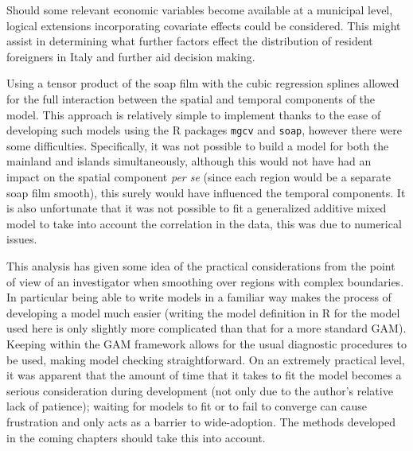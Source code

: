 Should some relevant economic variables become available at a municipal level, logical extensions incorporating covariate effects could be considered. This might assist in determining what further factors effect the distribution of resident foreigners in Italy and further aid decision making.

Using a tensor product of the soap film with the cubic regression splines allowed for the full interaction between the spatial and temporal components of the model. This approach is relatively simple to implement thanks to the ease of developing such models using the \textsf{R} packages \texttt{mgcv} and \texttt{soap}, however there were some difficulties. Specifically, it was not possible to build a model for both the mainland and islands simultaneously, although this would not have had an impact on the spatial component \textit{per se} (since each region would be a separate soap film smooth), this surely would have influenced the temporal components. It is also unfortunate that it was not possible to fit a generalized additive mixed model to take into account the correlation in the data, this was due to numerical issues.

This analysis has given some idea of the practical considerations from the point of view of an investigator when smoothing over regions with complex boundaries. In particular being able to write models in a familiar way makes the process of developing a model much easier (writing the model definition in \textsf{R} for the model used here is only slightly more complicated than that for a more standard GAM). Keeping within the GAM framework allows for the usual diagnostic procedures to be used, making model checking straightforward. On an extremely practical level, it was apparent that the amount of time that it takes to fit the model becomes a serious consideration during development (not only due to the author's relative lack of patience); waiting for models to fit or to fail to converge can cause frustration and only acts as a barrier to wide-adoption. The methods developed in the coming chapters should take this into account.


